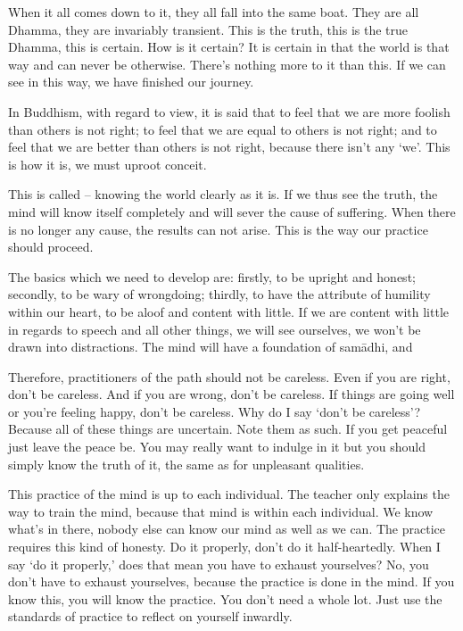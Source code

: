 When it all comes down to it, they all fall into the same boat. They are all Dhamma, they are invariably transient. This is the truth, this is the true Dhamma, this is certain. How is it certain? It is certain in that the world is that way and can never be otherwise. There's nothing more to it than this. If we can see in this way, we have finished our journey. 

In Buddhism, with regard to view, it is said that to feel that we are more foolish than others is not right; to feel that we are equal to others is not right; and to feel that we are better than others is not right, because there isn't any `we'. This is how it is, we must uproot conceit. 

This is called  -- knowing the world clearly as it is. If we thus see the truth, the mind will know itself completely and will sever the cause of suffering. When there is no longer any cause, the results can not arise. This is the way our practice should proceed. 

The basics which we need to develop are: firstly, to be upright and honest; secondly, to be wary of wrongdoing; thirdly, to have the attribute of humility within our heart, to be aloof and content with little. If we are content with little in regards to speech and all other things, we will see ourselves, we won't be drawn into distractions. The mind will have a foundation of  sam\=adhi, and 

Therefore, practitioners of the path should not be careless. Even if you are right, don't be careless. And if you are wrong, don't be careless. If things are going well or you're feeling happy, don't be careless. Why do I say `don't be careless'? Because all of these things are uncertain. Note them as such. If you get peaceful just leave the peace be. You may really want to indulge in it but you should simply know the truth of it, the same as for unpleasant qualities. 

This practice of the mind is up to each individual. The teacher only explains the way to train the mind, because that mind is within each individual. We know what's in there, nobody else can know our mind as well as we can. The practice requires this kind of honesty. Do it properly, don't do it half-heartedly. When I say `do it properly,' does that mean you have to exhaust yourselves? No, you don't have to exhaust yourselves, because the practice is done in the mind. If you know this, you will know the practice. You don't need a whole lot. Just use the standards of practice to reflect on yourself inwardly. 

